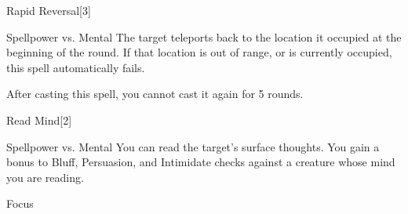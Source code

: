 \begin{spellsection}{Rapid Reversal}[3]
    \begin{spellheader}
    \end{spellheader}
    \begin{spellcontent}
        \begin{spelltargetinginfo}
        \end{spelltargetinginfo}
        \begin{spelleffects}
            \begin{spellattack}{Spellpower vs. Mental}
                \spellsuccess The target teleports back to the location it occupied at the beginning of the round.
                If that location is out of range, or is currently occupied, this spell automatically fails.
            \end{spellattack}
            \spellspecial After casting this spell, you cannot cast it again for 5 rounds.
        \end{spelleffects}
    \end{spellcontent}
    \begin{spellfooter}
        \miscastrandom
    \end{spellfooter}
\end{spellsection}

\begin{spellsection}{Read Mind}[2]
    \begin{spellheader}
    \end{spellheader}
    \begin{spellcontent}
        \begin{spelltargetinginfo}
        \end{spelltargetinginfo}
        \begin{spelleffects}
            \begin{spellattack}{Spellpower vs. Mental}
                \spellsuccess You can read the target's surface thoughts. You gain a  bonus to Bluff, Persuasion, and Intimidate checks against a creature whose mind you are reading.
            \end{spellattack}
            \spelldur Focus
        \end{spelleffects}
    \end{spellcontent}
    \begin{spellfooter}
        \miscastrandom
    \end{spellfooter}
    \begin{spellaugments}
    \end{spellaugments}
\end{spellsection}

